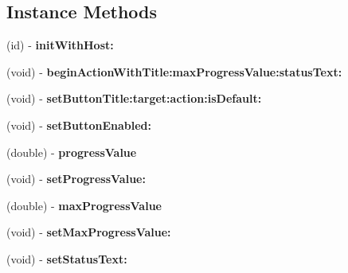 \subsection*{Instance Methods}
\begin{DoxyCompactItemize}
\item 
\mbox{\label{interface_s_u_status_controller_aa1b0620f994970955b3d65ade7289bda}} 
(id) -\/ {\bfseries init\+With\+Host\+:}
\item 
\mbox{\label{interface_s_u_status_controller_aaea389abcd2b3fc2e7e051b6758322f6}} 
(void) -\/ {\bfseries begin\+Action\+With\+Title\+:max\+Progress\+Value\+:status\+Text\+:}
\item 
\mbox{\label{interface_s_u_status_controller_aa62f6ebb3c2294541a6e68f7d27a6587}} 
(void) -\/ {\bfseries set\+Button\+Title\+:target\+:action\+:is\+Default\+:}
\item 
\mbox{\label{interface_s_u_status_controller_ae744b7d2f4183b880b1e8560468bc64c}} 
(void) -\/ {\bfseries set\+Button\+Enabled\+:}
\item 
\mbox{\label{interface_s_u_status_controller_a3ff5a7083f11c481a19c887ca1c1c0f9}} 
(double) -\/ {\bfseries progress\+Value}
\item 
\mbox{\label{interface_s_u_status_controller_a78281f5f517f23a2b5baa5c6a03eca6b}} 
(void) -\/ {\bfseries set\+Progress\+Value\+:}
\item 
\mbox{\label{interface_s_u_status_controller_a367e28b69da90b5ea91878f7c0138ad1}} 
(double) -\/ {\bfseries max\+Progress\+Value}
\item 
\mbox{\label{interface_s_u_status_controller_ae226db046c880193c222817847998ec9}} 
(void) -\/ {\bfseries set\+Max\+Progress\+Value\+:}
\item 
\mbox{\label{interface_s_u_status_controller_a30f91636c43351e40c21507dfaacbd22}} 
(void) -\/ {\bfseries set\+Status\+Text\+:}
\end{DoxyCompactItemize}
